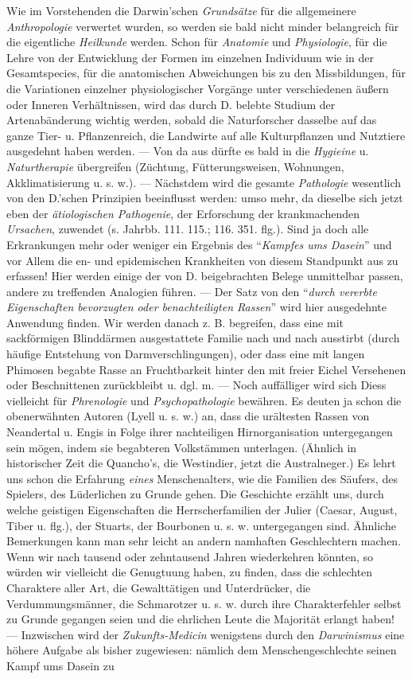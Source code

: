 \documentclass[a4paper, 11pt, oneside, english]{article}
\begin{document}
Wie im Vorstehenden die Darwin'schen \emph{Grundsätze} für die allgemeinere \emph{Anthropologie} verwertet wurden, so werden sie bald nicht minder belangreich für die eigentliche \emph{Heilkunde} werden. Schon für \emph{Anatomie} und \emph{Physiologie}, für die Lehre von der Entwicklung der Formen im einzelnen Individuum wie in der Gesamtspecies, für die anatomischen Abweichungen bis zu den Missbildungen, für die Variationen einzelner physiologischer Vorgänge unter verschiedenen äußern oder Inneren Verhältnissen, wird das durch D. belebte Studium der Artenabänderung wichtig werden, sobald die Naturforscher dasselbe auf das ganze Tier- u. Pflanzenreich, die Landwirte auf alle Kulturpflanzen und Nutztiere ausgedehnt haben werden. --- Von da aus dürfte es bald in die \emph{Hygieine} u. \emph{Naturtherapie} übergreifen (Züchtung, Fütterungsweisen, Wohnungen, Akklimatisierung u. s. w.). --- Nächstdem wird die gesamte \emph{Pathologie} wesentlich von den D.'schen Prinzipien beeinflusst werden: umso mehr, da dieselbe sich jetzt eben der \emph{ätiologischen Pathogenie}, der Erforschung der krankmachenden \emph{Ursachen}, zuwendet (s. Jahrbb. 111. 115.; 116. 351. flg.). Sind ja doch alle Erkrankungen mehr oder weniger ein Ergebnis des "`\emph{Kampfes ums Dasein}"' und vor Allem die en- und epidemischen Krankheiten von diesem Standpunkt aus zu erfassen! Hier werden einige der von D. beigebrachten Belege unmittelbar passen, andere zu treffenden Analogien führen. --- Der Satz von den "`\emph{durch vererbte Eigenschaften bevorzugten oder benachteiligten Rassen}"' wird hier ausgedehnte Anwendung finden. Wir werden danach z. B. begreifen, dass eine mit sackförmigen Blinddärmen ausgestattete Familie nach und nach ausstirbt (durch häufige Entstehung von Darmverschlingungen), oder dass eine mit langen Phimosen begabte Rasse an Fruchtbarkeit hinter den mit freier Eichel Versehenen oder Beschnittenen zurückbleibt u. dgl. m. --- Noch auffälliger wird sich Diess vielleicht für \emph{Phrenologie} und \emph{Psychopathologie} bewähren. Es deuten ja schon die obenerwähnten Autoren (Lyell u. s. w.) an, dass die urältesten Rassen von Neandertal u. Engis in Folge ihrer nachteiligen Hirnorganisation untergegangen sein mögen, indem sie begabteren Volkstämmen unterlagen. (Ähnlich in historischer Zeit die Quancho's, die Westindier, jetzt die Australneger.) Es lehrt uns schon die Erfahrung \emph{eines} Menschenalters, wie die Familien des Säufers, des Spielers, des Lüderlichen zu Grunde gehen. Die Geschichte erzählt uns, durch welche geistigen Eigenschaften die Herrscherfamilien der Julier (Caesar, August, Tiber u. flg.), der Stuarts, der Bourbonen u. s. w. untergegangen sind. Ähnliche Bemerkungen kann man sehr leicht an andern namhaften Geschlechtern machen. Wenn wir nach tausend oder zehntausend Jahren wiederkehren könnten, so würden wir vielleicht die Genugtuung haben, zu finden, dass die schlechten Charaktere aller Art, die Gewalttätigen und Unterdrücker, die Verdummungsmänner, die Schmarotzer u. s. w. durch ihre Charakterfehler selbst zu Grunde gegangen seien und die ehrlichen Leute die Majorität erlangt haben! --- Inzwischen wird der \emph{Zukunfts-Medicin} wenigstens durch den \emph{Darwinismus} eine höhere Aufgabe als bisher zugewiesen: nämlich dem Menschengeschlechte seinen Kampf ums Dasein zu 
\end{document}
